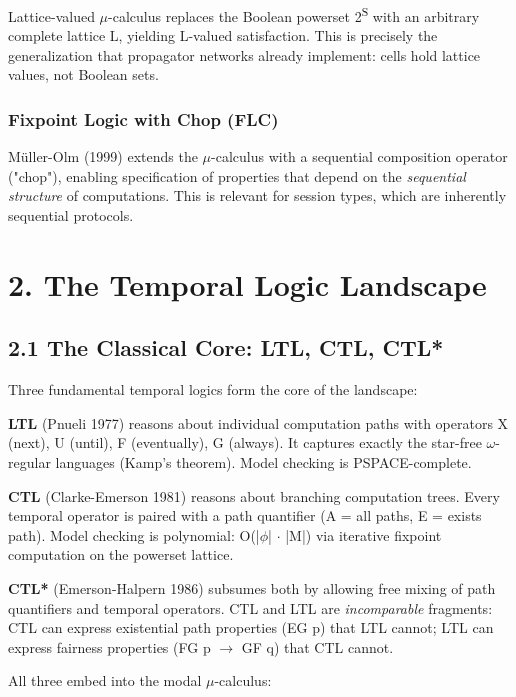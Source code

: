 \documentclass[11pt]{article}
\begin{document}
Lattice-valued \(\mu\)-calculus replaces the Boolean powerset 2\textsuperscript{S} with an arbitrary
complete lattice L, yielding L-valued satisfaction. This is precisely the
generalization that propagator networks already implement: cells hold lattice
values, not Boolean sets.
\subsubsection{Fixpoint Logic with Chop (FLC)}
\label{sec:orge0947d5}

Müller-Olm (1999) extends the \(\mu\)-calculus with a sequential composition operator
("chop"), enabling specification of properties that depend on the \emph{sequential
structure} of computations. This is relevant for session types, which are
inherently sequential protocols.
\section{2. The Temporal Logic Landscape}
\label{sec:org1be338f}

\subsection{2.1 The Classical Core: LTL, CTL, CTL*}
\label{sec:orgd781ad9}

Three fundamental temporal logics form the core of the landscape:

\textbf{LTL} (Pnueli 1977) reasons about individual computation paths with operators
X (next), U (until), F (eventually), G (always). It captures exactly the
star-free \(\omega\)-regular languages (Kamp's theorem). Model checking is
PSPACE-complete.

\textbf{CTL} (Clarke-Emerson 1981) reasons about branching computation trees. Every
temporal operator is paired with a path quantifier (A = all paths, E = exists
path). Model checking is polynomial: O(|\(\phi\)| \(\cdot\) |M|) via iterative fixpoint
computation on the powerset lattice.

\textbf{CTL*} (Emerson-Halpern 1986) subsumes both by allowing free mixing of path
quantifiers and temporal operators. CTL and LTL are \emph{incomparable} fragments:
CTL can express existential path properties (EG p) that LTL cannot; LTL can
express fairness properties (FG p \(\to\) GF q) that CTL cannot.

All three embed into the modal \(\mu\)-calculus:
\end{document}
